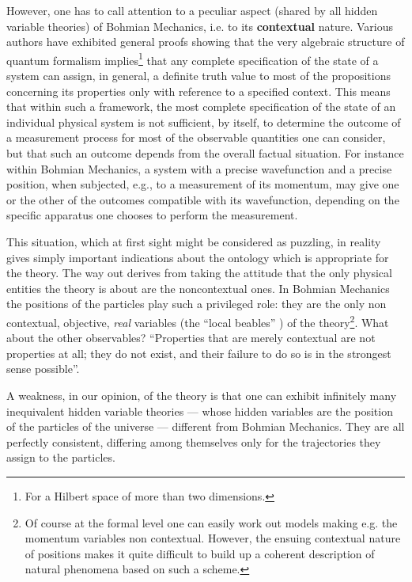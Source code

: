\documentclass[10pt,a4paper]{article}
\begin{document}
However, one has to call attention to a peculiar aspect (shared by
all hidden variable theories) of Bohmian Mechanics, i.e. to its
{\bf contextual} nature.  Various authors \cite{gl,ks} have
exhibited general proofs showing that the very algebraic structure
of quantum formalism implies\footnote{For a Hilbert space of more
than two dimensions.} that any complete specification of the state
of a system can assign, in general, a definite truth value to most
of the propositions concerning its properties only with reference
to a specified context. This means that within such a framework,
the most complete specification of the state of an individual
physical system is not sufficient, by itself, to determine the
outcome of a measurement process for most of the observable
quantities one can consider, but that such an outcome depends from
the overall factual situation. For instance within Bohmian
Mechanics, a system with a precise wavefunction and a precise
position, when subjected, e.g., to a measurement  of its momentum,
may give one or the other of the outcomes compatible with its
wavefunction, depending on the specific apparatus one chooses to
perform the measurement.

This situation, which at first sight might be considered as
puzzling, in reality  gives simply important indications about the
ontology which is appropriate for the theory. The way out derives
from taking the attitude that the only physical entities the
theory is about are the noncontextual ones. In Bohmian Mechanics
the positions of the particles play such a privileged role: they
are the only non contextual, objective, {\it real} variables (the
``local beables'' \cite{bell1,bell1b}) of the theory\footnote{Of
course at the formal level one can easily work out models making
e.g. the momentum variables non contextual. However, the ensuing
contextual nature of positions makes it quite difficult to build
up a coherent description of natural phenomena based on such a
scheme.}. What about the other observables? \cite{dgz3}
``Properties that are merely contextual are not properties at all;
they do not exist, and their failure to do so is in the strongest
sense possible''.

A weakness, in our opinion, of the theory is that one can exhibit
\cite{dg} infinitely many inequivalent hidden variable theories
--- whose hidden variables are the position of the particles of
the universe --- different from Bohmian Mechanics. They are all
perfectly consistent, differing among themselves only for the
trajectories they assign to the particles.
\end{document}
